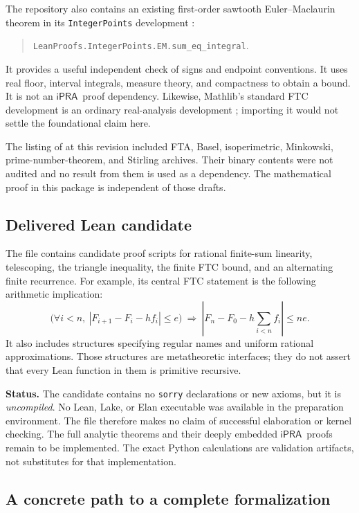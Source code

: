 \documentclass[11pt]{article}
\theoremstyle{definition}
\newcommand{\ipra}{\ensuremath{\mathsf{iPRA}}}
\newcommand{\abs}[1]{\left|#1\right|}
\newcommand{\code}[1]{\texttt{#1}}
\begin{document}
The repository also contains an existing first-order sawtooth
Euler--Maclaurin theorem in its \code{IntegerPoints} development
\cite{existingem}:
\begin{quote}\small
\code{LeanProofs.IntegerPoints.EM.sum\_eq\_integral}.
\end{quote}
It provides a useful independent check of signs and
endpoint conventions.  It uses real floor, interval integrals, measure
theory, and compactness to obtain a bound.  It is not an \ipra\ proof
dependency.  Likewise, Mathlib's standard FTC development is an
ordinary real-analysis development \cite{mathlibftc}; importing it
would not settle the foundational claim here.

The listing of  at this revision included FTA, Basel,
isoperimetric, Minkowski, prime-number-theorem, and Stirling archives.
Their binary contents were not audited and no result from them is used
as a dependency.  The mathematical proof in this package is independent
of those drafts.

\subsection{Delivered Lean candidate}

The file  contains candidate proof scripts
for rational finite-sum linearity, telescoping, the triangle inequality,
the finite FTC bound, and an alternating finite recurrence.  For example,
its central FTC statement is the following arithmetic implication:
\[
 \bigl(\forall i<n,\ \abs{F_{i+1}-F_i-hf_i}\le e\bigr)
 \ \Longrightarrow\
 \abs{F_n-F_0-h\sum_{i<n}f_i}\le ne.
\]
It also includes structures specifying regular names and uniform
rational approximations.  Those structures are metatheoretic interfaces;
they do not assert that every Lean function in them is primitive
recursive.

\textbf{Status.} The candidate contains no \code{sorry} declarations or
new axioms, but it is \emph{uncompiled}.  No Lean, Lake, or Elan
executable was available in the preparation environment.  The file
therefore makes no claim of successful elaboration or kernel checking.
The full analytic theorems and their deeply embedded \ipra\ proofs
remain to be implemented.  The exact Python calculations are validation
artifacts, not substitutes for that implementation.

\subsection{A concrete path to a complete formalization}
\end{document}
